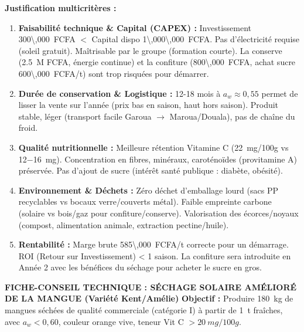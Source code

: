 \documentclass[11pt]{article}
\begin{document}
\begin{exoresolu}
\textbf{Justification multicritères :}
\begin{enumerate}
    \item \textbf{Faisabilité technique \& Capital (CAPEX) :} Investissement \SI{300\,000}{FCFA} $<$ Capital dispo \SI{1\,000\,000}{FCFA}. Pas d'électricité requise (soleil gratuit). Maîtrisable par le groupe (formation courte). La conserve (\SI{2,5}{M} FCFA, énergie continue) et la confiture (\SI{800\,000}{FCFA}, achat sucre \SI{600\,000}{FCFA}/t) sont trop risquées pour démarrer.
    \item \textbf{Durée de conservation \& Logistique :} 12-18 mois à $a_w \approx 0,55$ permet de lisser la vente sur l'année (prix bas en saison, haut hors saison). Produit stable, léger (transport facile Garoua $\rightarrow$ Maroua/Douala), pas de chaîne du froid.
    \item \textbf{Qualité nutritionnelle :} Meilleure rétention Vitamine C (\SI{22}{mg/100g} vs \SI{12-16}{mg}). Concentration en fibres, minéraux, caroténoïdes (provitamine A) préservée. Pas d'ajout de sucre (intérêt santé publique : diabète, obésité).
    \item \textbf{Environnement \& Déchets :} Zéro déchet d'emballage lourd (sacs PP recyclables vs bocaux verre/couverts métal). Faible empreinte carbone (solaire vs bois/gaz pour confiture/conserve). Valorisation des écorces/noyaux (compost, alimentation animale, extraction pectine/huile).
    \item \textbf{Rentabilité :} Marge brute \SI{585\,000}{FCFA/t} correcte pour un démarrage. ROI (Retour sur Investissement) < 1 saison. La confiture sera introduite en Année 2 avec les bénéfices du séchage pour acheter le sucre en gros.
\end{enumerate}

\textbf{FICHE-CONSEIL TECHNIQUE : SÉCHAGE SOLAIRE AMÉLIORÉ DE LA MANGUE (Variété Kent/Amélie)}
\vspace{0.5em}
\noindent\textbf{Objectif :} Produire \SI{180}{kg} de mangues séchées de qualité commerciale (catégorie I) à partir de \SI{1}{t} fraîches, avec $a_w < 0,60$, couleur orange vive, teneur Vit C $> \SI{20}{mg/100g}$.


\end{exoresolu}
\end{document}
